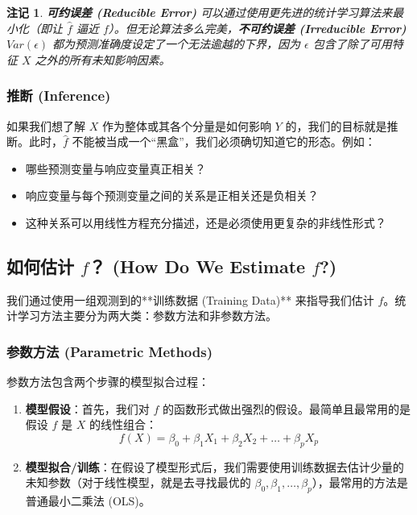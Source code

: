 \documentclass[UTF8]{ctexart}
\newtheorem{remark}{注记}[section]
\numberwithin{equation}{section}
\begin{document}
\begin{remark}
\textbf{可约误差 (Reducible Error)} 可以通过使用更先进的统计学习算法来最小化（即让 $\hat{f}$ 逼近 $f$）。但无论算法多么完美，\textbf{不可约误差 (Irreducible Error)} $Var(\epsilon)$ 都为预测准确度设定了一个无法逾越的下界，因为 $\epsilon$ 包含了除了可用特征 $X$ 之外的所有未知影响因素。
\end{remark}

\subsubsection{推断 (Inference)}
如果我们想了解 $X$ 作为整体或其各个分量是如何影响 $Y$ 的，我们的目标就是推断。此时，$\hat{f}$ 不能被当成一个“黑盒”，我们必须确切知道它的形态。例如：
\begin{itemize}
    \item 哪些预测变量与响应变量真正相关？
    \item 响应变量与每个预测变量之间的关系是正相关还是负相关？
    \item 这种关系可以用线性方程充分描述，还是必须使用更复杂的非线性形式？
\end{itemize}

\subsection{如何估计 $f$？ (How Do We Estimate $f$?)}

我们通过使用一组观测到的**训练数据 (Training Data)** 来指导我们估计 $f$。统计学习方法主要分为两大类：参数方法和非参数方法。

\subsubsection{参数方法 (Parametric Methods)}
参数方法包含两个步骤的模型拟合过程：
\begin{enumerate}
    \item \textbf{模型假设}：首先，我们对 $f$ 的函数形式做出强烈的假设。最简单且最常用的是假设 $f$ 是 $X$ 的线性组合：
    \begin{equation}
    f(X) = \beta_0 + \beta_1 X_1 + \beta_2 X_2 + \dots + \beta_p X_p
    \end{equation}
    \item \textbf{模型拟合/训练}：在假设了模型形式后，我们需要使用训练数据去估计少量的未知参数（对于线性模型，就是去寻找最优的 $\beta_0, \beta_1, \dots, \beta_p$），最常用的方法是普通最小二乘法 (OLS)。
\end{enumerate}
\end{document}
